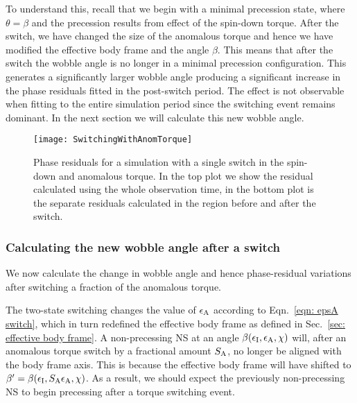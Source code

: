 \documentclass[../full_thesis/full_thesis.tex]{subfiles}
\begin{document}
To understand this, recall that we begin with a minimal precession state, where
$\theta = \beta$ and the precession results from effect of the spin-down
torque.  After the switch, we have changed the size of the anomalous torque and
hence we have modified the effective body frame and the angle $\beta$. This
means that after the switch the wobble angle is no longer in a minimal
precession configuration.
This generates a significantly larger wobble angle producing a significant
increase in the phase residuals fitted in the post-switch period. The effect is
not observable when fitting to the entire simulation period since the switching
event remains dominant. In the next section we will calculate this new wobble
angle.

\begin{figure}[htb]
\texttt{[image: SwitchingWithAnomTorque]} \caption{Phase
residuals for a simulation with a single switch in the spin-down and anomalous
torque. In the top plot we show the residual calculated using the whole
observation time, in the bottom plot is the separate residuals calculated in
the region before and after the switch.}
\label{fig: switching with anom}
\end{figure}

\subsubsection{Calculating the new wobble angle after a switch}
We now calculate the change in wobble angle and hence phase-residual variations
after switching a fraction of the anomalous torque.

The two-state switching changes the value of $\epsilon_{\mathrm{A}}$ according to
Eqn.~\eqref{eqn: epsA switch}, which in turn redefined the effective body frame
as defined in Sec.~\ref{sec: effective body frame}. A non-precessing NS at an
angle $\beta(\epsilon_{\mathrm{I}}, \epsilon_{\mathrm{A}}, \chi)$ will, after an anomalous torque switch by a fractional
amount $S_{\mathrm{A}}$, no longer be aligned with the body frame axis. This is
because the effective body frame will have shifted to $\beta' = \beta(\epsilon_{\mathrm{I}},
S_{\mathrm{A}}\epsilon_{\mathrm{A}}, \chi)$. As a result, we should expect the previously
non-precessing NS to begin precessing after a torque switching event.
\end{document}
